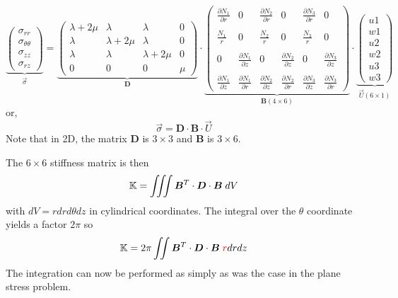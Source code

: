\[
\underbrace{
\left(
\begin{array}{c}
\sigma_{rr} \\
\sigma_{\theta\theta} \\
\sigma_{zz} \\
\sigma_{rz} 
\end{array}
\right)
}_{\vec{\sigma}}
=
\underbrace{
\left(
\begin{array}{cccc}
\lambda+2\mu & \lambda & \lambda & 0  \\
\lambda & \lambda+2\mu & \lambda & 0  \\
\lambda & \lambda & \lambda+2\mu & 0  \\
0 & 0 & 0 & \mu 
\end{array}
\right)
}_{\bm D}
\!
\cdot
\!
\underbrace{
\left(
\begin{array}{ccccccccc}
\frac{\partial N_1}{\partial r} &  0 &  
\frac{\partial N_2}{\partial r} &  0 &
\frac{\partial N_3}{\partial r} &  0 \\  \\
\frac{N_1}{r}  & 0 &  
\frac{N_2}{r}  & 0 &
\frac{N_3}{r}  & 0 \\  \\
 0 & \frac{\partial N_1}{\partial z}  &
 0 & \frac{\partial N_2}{\partial z}  &
 0 & \frac{\partial N_3}{\partial z}  \\ \\
\frac{\partial N_1}{\partial z} & \frac{\partial N_1}{\partial r}  &
\frac{\partial N_2}{\partial z} & \frac{\partial N_2}{\partial r}  &
\frac{\partial N_3}{\partial z} & \frac{\partial N_3}{\partial r}   
\end{array}
\right)
}_{\bm B (4\times 6) }
\!
\cdot
\!
\underbrace{
\left(
\begin{array}{c}
u1 \\  w1 \\ u2 \\  w2 \\ u3 \\ w3 
\end{array}
\right)
}_{\vec U (6\times1)}
\]
or, 
\[
\boxed{
\vec\sigma = {\bm D} \cdot {\bm B} \cdot \vec{U}
}
\]
Note that in 2D, the matrix ${\bm D}$ is $3\times3$ and 
${\bm B}$ is $3\times 6$.


\noindent The $6\times 6$ stiffness matrix is then 
\[
{\mathbb{K}} = \iiint {\bm B}^T \cdot {\bm D} \cdot {\bm B}\; dV
\]
with $dV= r dr d\theta dz$ in cylindrical coordinates. The integral 
over the $\theta$ coordinate yields a factor $2\pi$ so 
\[
{\mathbb{K}} = 2 \pi \iint {\bm B}^T \cdot {\bm D} \cdot {\bm B}\; {\color{red} r} drdz
\]
The integration can now be performed as simply as was the case in the plane stress problem.

